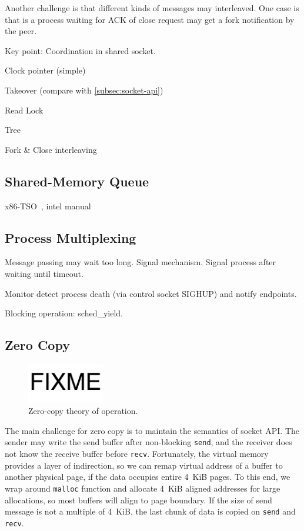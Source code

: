 Another challenge is that different kinds of messages may interleaved. One case is that is a process waiting for ACK of close request may get a fork notification by the peer.
  
Key point: Coordination in shared socket.

Clock pointer (simple)

Takeover (compare with \ref{subsec:socket-api})

Read Lock

Tree

Fork \& Close interleaving

\subsection{Shared-Memory Queue}

x86-TSO~\cite{sewell2010x86}, intel manual~\cite{intel-manual}

\subsection{Process Multiplexing}
\label{subsec:epoll}


Message passing may wait too long.
Signal mechanism. Signal process after waiting until timeout.

Monitor detect process death (via control socket SIGHUP) and notify endpoints.

Blocking operation: sched\_yield.


\subsection{Zero Copy}
\label{subsec:zerocopy}

\begin{figure}[t]
	\centering
	\includegraphics[width=0.3\textwidth]{images/fixme}
	\caption{Zero-copy theory of operation.}
	\label{fig:zerocopy}
\end{figure}

The main challenge for zero copy is to maintain the semantics of socket API. The sender may write the send buffer after non-blocking \texttt{send}, and the receiver does not know the receive buffer before \texttt{recv}.
Fortunately, the virtual memory provides a layer of indirection, so we can remap virtual address of a buffer to another physical page, if the data occupies entire 4~KiB pages.
To this end, we wrap around \texttt{malloc} function and allocate 4~KiB aligned addresses for large allocations, so most buffers will align to page boundary.
If the size of send message is not a multiple of 4~KiB, the last chunk of data is copied on \texttt{send} and \texttt{recv}.

